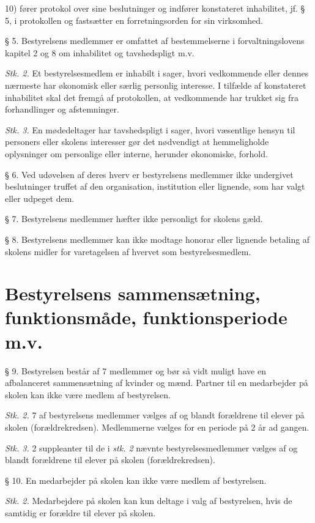 \documentclass[11pt, a4paper]{article}
\begin{document}
10) fører protokol over sine beslutninger og indfører konstateret inhabilitet, jf. § 5, i protokollen og fastsætter en forretningsorden for sin virksomhed.

§ 5. Bestyrelsens medlemmer er omfattet af bestemmelserne i forvaltningslovens kapitel 2 og 8 om inhabilitet og tavshedspligt m.v.

\textit{Stk. 2.} Et bestyrelsesmedlem er inhabilt i sager, hvori vedkommende eller dennes nærmeste har økonomisk eller særlig personlig interesse. I tilfælde af konstateret inhabilitet skal det fremgå af protokollen, at vedkommende har trukket sig fra forhandlinger og afstemninger.

\textit{Stk. 3.} En mødedeltager har tavshedspligt i sager, hvori væsentlige hensyn til personers eller skolens interesser gør det nødvendigt at hemmeligholde oplysninger om personlige eller interne, herunder økonomiske, forhold.


§ 6. Ved udøvelsen af deres hverv er bestyrelsens medlemmer ikke undergivet beslutninger truffet af den organisation, institution eller lignende, som har valgt eller udpeget dem.


§ 7. Bestyrelsens medlemmer hæfter ikke personligt for skolens gæld.


§ 8. Bestyrelsens medlemmer kan ikke modtage honorar eller lignende betaling af skolens midler for varetagelsen af hvervet som bestyrelsesmedlem.

\section*{Bestyrelsens sammensætning, funktionsmåde, funktionsperiode m.v.}
§ 9. Bestyrelsen består af 7 medlemmer og bør så vidt muligt have en afbalanceret sammensætning af kvinder og mænd. Partner til en medarbejder på skolen kan ikke være medlem af bestyrelsen.

\textit{Stk. 2.} 7 af bestyrelsens medlemmer vælges af og blandt forældrene til elever på skolen (forældrekredsen). Medlemmerne vælges for en periode på 2 år ad gangen.

\textit{Stk. 3.} 2 suppleanter til de i \textit{stk. 2 }nævnte bestyrelsesmedlemmer vælges af og blandt forældrene til elever på skolen (forældrekredsen).

§ 10. En medarbejder på skolen kan ikke være medlem af bestyrelsen.

\textit{Stk. 2.} Medarbejdere på skolen kan kun deltage i valg af bestyrelsen, hvis de samtidig er forældre til elever på skolen.
\end{document}
